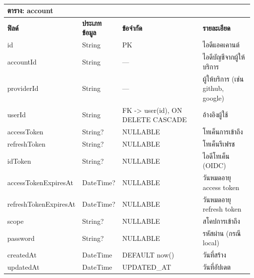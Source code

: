 \begin{table}[htbp]
    \caption{}\label{tab3:account_fields}
    \centering
    \renewcommand{\arraystretch}{1.2}
    \small
    \begin{tabular}{p{} p{} p{} p{}}
        \hline
        \multicolumn{4}{l}{\textbf{ตาราง: account}} \\
        \hline
            \textbf{ฟิลด์} & \textbf{ประเภทข้อมูล} & \textbf{ข้อจำกัด} & \textbf{รายละเอียด} \\
        \hline
        id & String & PK & ไอดีแอคเคานต์ \\
        accountId & String & — & ไอดีบัญชีจากผู้ให้บริการ \\
        providerId & String & — & ผู้ให้บริการ (เช่น github, google) \\
        userId & String & FK -> user(id), ON DELETE CASCADE & อ้างอิงผู้ใช้ \\
        accessToken & String? & NULLABLE & โทเค็นการเข้าถึง \\
        refreshToken & String? & NULLABLE & โทเค็นรีเฟรช \\
        idToken & String? & NULLABLE & ไอดีโทเค็น (OIDC) \\
        accessTokenExpiresAt & DateTime? & NULLABLE & วันหมดอายุ access token \\
        refreshTokenExpiresAt & DateTime? & NULLABLE & วันหมดอายุ refresh token \\
        scope & String? & NULLABLE & สโคปการเข้าถึง \\
        password & String? & NULLABLE & รหัสผ่าน (กรณี local) \\
        createdAt & DateTime & DEFAULT now() & วันที่สร้าง \\
        updatedAt & DateTime & UPDATED\_AT & วันที่อัปเดต \\
        \hline
    \end{tabular}
\end{table}

